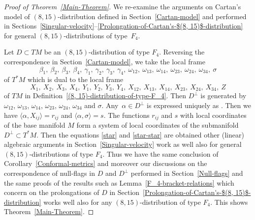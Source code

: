 \documentclass[11pt]{article}
\numberwithin{equation}{section}
\numberwithin{equation}{section}
\theoremstyle{definition}
\newcommand{\0}{\boldsymbol{0}}
\begin{document}
\begin{proof}[Proof of Theorem~\ref{Main-Theorem}]
We re-examine the arguments on Cartan's model of $(8, 15)$-dis\-tri\-bu\-tion
defined in Section~\ref{Cartan-model} and performed in Sections~\ref{Singular-velocity}--\ref{Prolongation-of-Cartan's-$(8, 15)$-distribution} for general $(8, 15)$-dis\-tri\-bu\-tions of type~$F_4$.

Let $D \subset TM$ be an $(8, 15)$-distribution of type $F_4$.
Reversing the correspondence in Section~\ref{Cartan-model},
we take the local frame
\[
\beta_1,\ \beta_2,\ \beta_3,\ \beta_4,\ \gamma_1,\ \gamma_2,\ \gamma_3,\ \gamma_4,\ \omega_{12},\ \omega_{13},\
\omega_{14},\ \omega_{23},\ \omega_{24},\ \omega_{34},\ \sigma
\]
of $T^*M$ which is dual to the local frame
\[
X_1,\ X_2,\ X_3,\ X_4,\ Y_1,\ Y_2,\ Y_3,\ Y_4,\ X_{12},\ X_{13},\ X_{14},\ X_{23},\ X_{24},\ X_{34},\ Z
\]
of $TM$ in Definition~\ref{(8, 15)-distribution-of-type-F_4}. Then $D^\perp$ is
generated by $\omega_{12}$,
$\omega_{13}$, $\omega_{14}$, $\omega_{23}$, $\omega_{24}$, $\omega_{34}$ and $\sigma$.
Any~$\alpha \in D^\perp$ is expressed uniquely as
. Then
we have $\langle \alpha, X_{ij}\rangle = r_{ij}$ and $\langle \alpha, \sigma\rangle = s$.
The functions $r_{ij}$ and $s$ with local coordinates of the base manifold
$M$ form a system of local coordinates of the submanifold $D^\perp \subset T^*M$.
Then the equations \eqref{star} and \eqref{star-star} are obtained
other (linear) algebraic arguments in Section~\ref{Singular-velocity} work as well
also for general $(8, 15)$-distributions of type $F_4$. Thus we have
the same conclusion of Corollary~\ref{Conformal-metrics} and moreover our discussions
on the correspondence of null-flags in $D$ and $D^\perp$
performed in Section~\ref{Null-flags} and the same proofs
of the results such as Lemma~\ref{F_4-bracket-relations}
which concern on the prolongations of $D$ in Section~\ref{Prolongation-of-Cartan's-$(8, 15)$-distribution}
works well also for any $(8, 15)$-distribution of type $F_4$. This shows Theorem~\ref{Main-Theorem}.
\end{proof}
\end{document}
